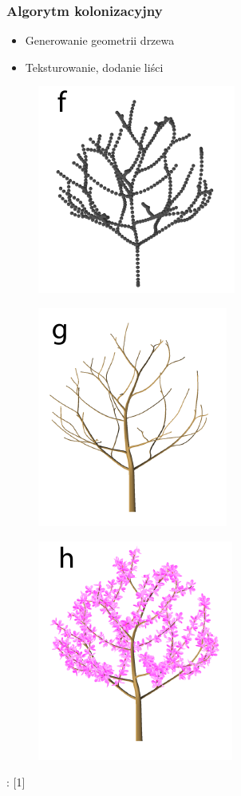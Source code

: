 \documentclass[blue,table]{beamer}
\begin{document}
\begin{frame}\frametitle{Algorytm kolonizacyjny}
\begin{itemize}
\item{Generowanie geometrii drzewa}
\item{Teksturowanie, dodanie liści}
\end{itemize}\begin{multicols}{3}
\begin{figure}
\includegraphics[scale=0.5]{img/colonization/colonization_6.png} 
\end{figure}
\begin{figure}
\includegraphics[scale=0.5]{img/colonization/colonization_7.png} 
\end{figure}
\begin{figure}
\includegraphics[scale=0.5]{img/colonization/colonization_8.png} 
\end{figure}
\end{multicols}
\begin{footnotesize}
: [1]
\end{footnotesize}
\end{frame}
\end{document}
